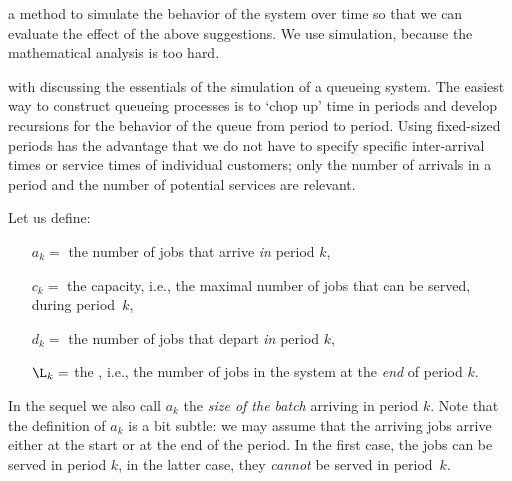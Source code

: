  a method to simulate the behavior of the system over time so that we can evaluate the effect of the above suggestions.
We use simulation, because the mathematical analysis is too hard.



 with discussing the essentials of the simulation of a queueing system.
The easiest way to construct queueing processes is to `chop up' time in periods
and develop recursions for the behavior of the queue from period to period.
Using fixed-sized periods has the advantage that we do not have to specify specific inter-arrival times or service times of individual customers; only the number of arrivals in a period and the number of potential services are relevant.


Let us define:
\begin{itemize}
 \item[$a_k =$] the number of jobs that arrive \textit{in} period $k$,
 \item[$c_k= $] the capacity, i.e., the maximal number of jobs that can be served, during period~$k$,
 \item[$d_k =$] the number of jobs that depart \textit{in} period $k$,
 \item[$\L_k =$] the , i.e., the number of jobs in the system at the \textit{end} of period $k$.
\end{itemize}
In the sequel we also call $a_k$ the \emph{size of the batch} arriving in period $k$.
Note that the definition of $a_k$ is a bit subtle: we may assume that the arriving jobs arrive either at the start or at the end of the period.
In the first case, the jobs can be served in period $k$, in the latter case, they \emph{cannot} be served in period~$k$.


